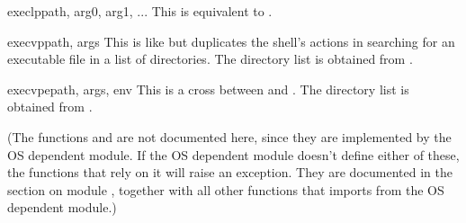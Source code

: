 \begin{funcdesc}{execlp}{path, arg0, arg1, ...}
This is equivalent to
.
\end{funcdesc}

\begin{funcdesc}{execvp}{path, args}
This is like  but duplicates
the shell's actions in searching for an executable file in a list of
directories.  The directory list is obtained from
.
\end{funcdesc}

\begin{funcdesc}{execvpe}{path, args, env}
This is a cross between  and .
The directory list is obtained from .
\end{funcdesc}

(The functions  and  are not
documented here, since they are implemented by the OS dependent
module.  If the OS dependent module doesn't define either of these,
the functions that rely on it will raise an exception.  They are
documented in the section on module , together with all
other functions that  imports from the OS dependent module.)
